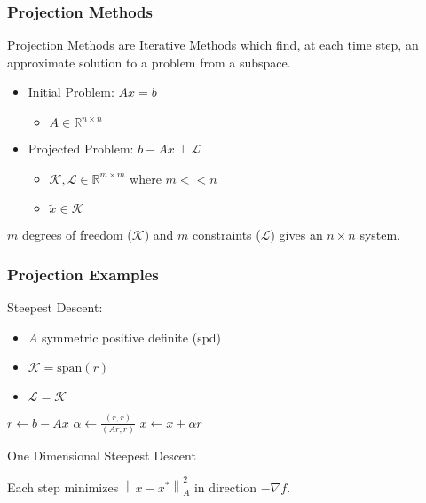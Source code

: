\documentclass{beamer}
\begin{document}
    \begin{frame}
      \frametitle{Projection Methods}
      Projection Methods are Iterative Methods which find, at each time step, an approximate solution to a problem from a subspace.

      \begin{itemize}
        \item Initial Problem: $Ax = b$
          \begin{itemize}
            \item $A \in \mathbb{R}^{n \times n}$
          \end{itemize}
        \item Projected Problem: $b-A \widetilde{x} \perp \mathcal{L}$
          \begin{itemize}
            \item $\mathcal{K},\mathcal{L} \in \mathbb{R}^{m \times m}$ where $m < < n$
            \item $\widetilde{x} \in \mathcal{K}$
          \end{itemize}
      \end{itemize}
      $m$ degrees of freedom ($\mathcal{K}$) and $m$ constraints ($\mathcal{L}$) gives an $n \times n$ system.
    \end{frame}

    \begin{frame}
      \frametitle{Projection Examples}
      Steepest Descent: 
      \begin{itemize}
        \item $A$ symmetric positive definite (spd)
        \item $\mathcal{K} = \text{span}(r)$ 
        \item $\mathcal{L} = \mathcal{K}$
      \end{itemize}
\begin{algorithm}[H]
\begin{algorithmic}
\State $r \gets b - A x$ 
\State $\alpha \gets \frac{\left( r,r \right)}{\left( Ar,r \right)}$ 
\State $x \gets x + \alpha r$
\EndFor
\end{algorithmic}
\caption{One Dimensional Steepest Descent}
\end{algorithm}
Each step minimizes $\left\| x - x^{*} \right\|_{A}^{2}$ in direction $-\nabla f$.
    \end{frame}

\begin{frame}
\end{frame}
\end{document}

